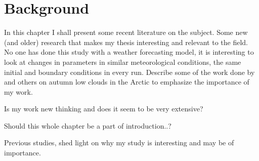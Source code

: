 \chapter{Background}%
\label{chap:background}
In this chapter I shall present some recent literature on the subject. Some new (and older) research that makes my thesis interesting and relevant to the field. No one has done this study with a weather forecasting model, it is interesting to look at changes in parameters in similar meteorological conditions, the same initial and boundary conditions in every run.
Describe some of the work done by \citet{Palm2010, Wu2012} and others on autumn low clouds in the Arctic to emphasize the importance of my work.

Is my work new thinking and does it seem to be very extensive?

Should this whole chapter be a part of introduction..?


Previous studies, shed light on why my study is interesting and may be of importance.